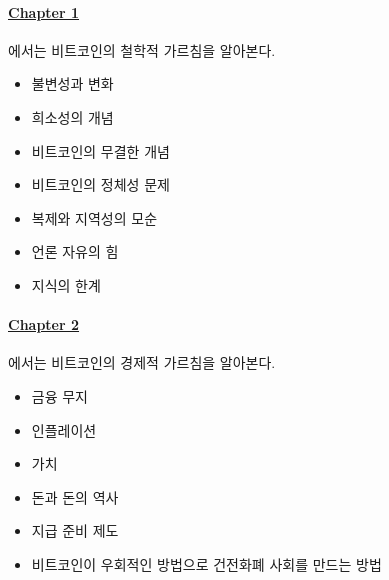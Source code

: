 
\paragraph{\hyperref[ch:philosophy]{Chapter 1}}{에서는 비트코인의 철학적 가르침을 알아본다.
	\begin{itemize}
		\item 불변성과 변화
		\item 희소성의 개념
		\item 비트코인의 무결한 개념
		\item 비트코인의 정체성 문제
		\item 복제와 지역성의 모순
		\item 언론 자유의 힘
		\item 지식의 한계
\end{itemize}}


\paragraph{\hyperref[ch:economics]{Chapter 2}}{에서는 비트코인의 경제적 가르침을 알아본다.
\begin{itemize}
	\item 금융 무지
	\item 인플레이션
	\item 가치
	\item 돈과 돈의 역사
	\item 지급 준비 제도
	\item 비트코인이 우회적인 방법으로 건전화폐 사회를 만드는 방법
	\end{itemize}}
	
